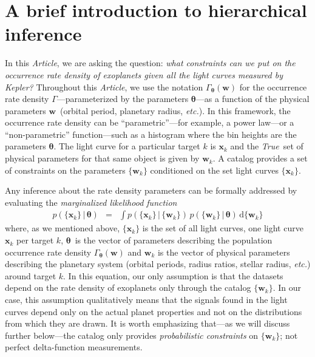 \documentclass[12pt,preprint]{aastex}
\newcommand{\project}[1]{{\sffamily #1}}
\newcommand{\kepler}{\project{Kepler}}
\newcommand{\paper}{\textsl{Article}}
\newcommand{\foreign}[1]{\emph{#1}}
\newcommand{\etc}{\foreign{etc.}}
\newcommand{\True}{\foreign{True}}
\newcommand{\eqlabel}[1]{\label{eq:#1}}
\newcommand{\dd}{\ensuremath{\,\mathrm{d}}}
\newcommand{\bvec}[1]{\ensuremath{\boldsymbol{#1}}}
\newcommand{\rate}{\ensuremath{\Gamma}}
\newcommand{\ratepar}{{\ensuremath{\theta}}}
\newcommand{\ratepars}{{\ensuremath{\bvec{\ratepar}}}}
\newcommand{\data}{{\ensuremath{\bvec{x}}}}
\newcommand{\entry}{{\ensuremath{\bvec{w}}}}
\begin{document}
\section{A brief introduction to hierarchical inference}

In this \paper, we are asking the question: \emph{what constraints can we put
on the occurrence rate density of exoplanets given all the light curves
measured by \kepler?}
Throughout this \paper, we use the notation $\rate_\ratepars(\entry)$ for the
occurrence rate density \rate---parameterized by the parameters \ratepars---as
a function of the physical parameters \entry\ (orbital period, planetary
radius, \etc).
In this framework, the occurrence rate density can be ``parametric''---for
example, a power law---or a ``non-parametric'' function---such as a histogram
where the bin heights are the parameters \ratepars.
The light curve for a particular target $k$ is $\data_k$ and the \True\ set of
physical parameters for that same object is given by $\entry_k$.
A catalog provides a set of constraints on the parameters $\{\entry_k\}$
conditioned on the set light curves $\{\data_k\}$.

Any inference about the rate density parameters can be formally addressed by
evaluating the \emph{marginalized likelihood function}
\begin{eqnarray}\eqlabel{crazylike}
p(\{\data_k\}\,|\,\ratepars) &=&
    \int p(\{\data_k\}\,|\,\{\entry_k\})
    \,p(\{\entry_k\}\,|\,\ratepars)
    \dd\{\entry_k\}
\end{eqnarray}
where, as we mentioned above, $\{\data_k\}$ is the set of all light curves,
one light curve $\data_k$ per target $k$, \ratepars\ is the vector of
parameters describing the population occurrence rate density
$\rate_\ratepars(\entry)$ and $\entry_k$ is the vector of physical parameters
describing the planetary system (orbital periods, radius ratios, stellar
radius, \etc) around target $k$.
In this equation, our only assumption is that the datasets depend on the
rate density of exoplanets only through the catalog $\{\entry_k\}$.
In our case, this assumption qualitatively means that the signals found in the
light curves depend only on the actual planet properties and not on the
distributions from which they are drawn.
It is worth emphasizing that---as we will discuss further below---the catalog
only provides \emph{probabilistic constraints} on $\{\entry_k\}$; not perfect
delta-function measurements.
\end{document}
